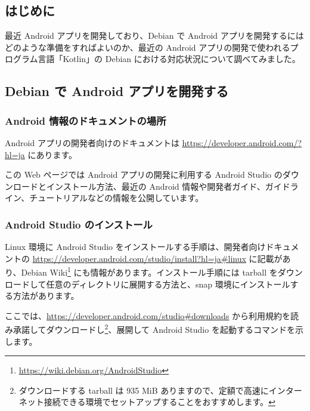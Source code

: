 \documentclass[mingoth,a4paper]{jsarticle}
\begin{document}
\subsection{はじめに}

最近 Android アプリを開発しており、Debian で Android アプリを開発するには
どのような準備をすればよいのか、最近の Android アプリの開発で使われるプログラム言語「Kotlin」の Debian における対応状況について調べてみました。


\subsection{Debian で Android アプリを開発する}

\subsubsection{Android 情報のドキュメントの場所}

Android アプリの開発者向けのドキュメントは \url{https://developer.android.com/?hl=ja} にあります。

この Web ページでは Android アプリの開発に利用する Android Studio のダウンロードとインストール方法、最近の Android 情報や開発者ガイド、ガイドライン、チュートリアルなどの情報を公開しています。


\subsubsection{Android Studio のインストール}

Linux 環境に Android Studio をインストールする手順は、開発者向けドキュメントの \url{https://developer.android.com/studio/install?hl=ja#linux} に記載があり、Debian Wiki\footnote{\url{https://wiki.debian.org/AndroidStudio}} にも情報があります。インストール手順には tarball をダウンロードして任意のディレクトリに展開する方法と、snap 環境にインストールする方法があります。

ここでは、\url{https://developer.android.com/studio#downloads} から利用規約を読み承諾してダウンロードし\footnote{ダウンロードする tarball は 935 MiB ありますので、定額で高速にインターネット接続できる環境でセットアップすることをおすすめします。}、展開して Android Studio を起動するコマンドを示します。

\end{document}

